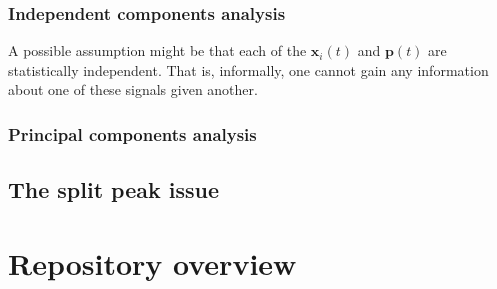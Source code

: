 \subsubsection{Independent components analysis}
A possible assumption might be that each of the $\mathbf{x}_i(t)$ and $\mathbf{p}(t)$ are statistically independent. That is, informally, one cannot gain any information about one of these signals given another.
%

\subsubsection{Principal components analysis}







\subsection{The split peak issue}
\section{Repository overview}